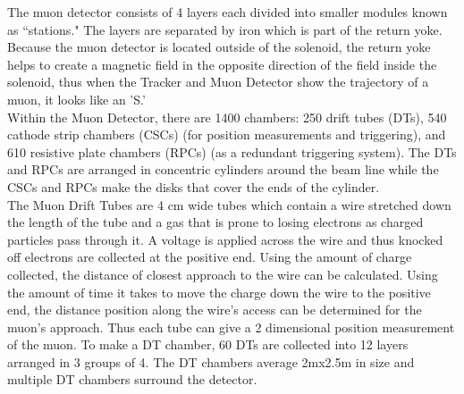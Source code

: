 	The muon detector consists of 4 layers each divided into smaller modules known as ``stations." The layers are separated by iron which is part of the return yoke. Because the muon detector is located outside of the solenoid, the return yoke helps to create a magnetic field in the opposite direction of the field inside the solenoid, thus when the Tracker and Muon Detector show the trajectory of a muon, it looks like an 'S.'\\
	
	Within the Muon Detector, there are 1400 chambers: 250 drift tubes (DTs), 540 cathode strip chambers (CSCs) (for position measurements and triggering), and 610 resistive plate chambers (RPCs) (as a redundant triggering system). The DTs and RPCs are arranged in concentric cylinders around the beam line while the CSCs and RPCs make the disks that cover the ends of the cylinder.\\
	
	The Muon Drift Tubes are 4 cm wide tubes which contain a wire stretched down the length of the tube and a gas that is prone to losing electrons as charged particles pass through it. A voltage is applied across the wire and thus knocked off electrons are collected at the positive end. Using the amount of charge collected, the distance of closest approach to the wire can be calculated. Using the amount of time it takes to move the charge down the wire to the positive end, the distance position along the wire's access can be determined for the muon's approach. Thus each tube can give a 2 dimensional position measurement of the muon. To make a DT chamber, 60 DTs are collected into 12 layers arranged in 3 groups of 4. The DT chambers average 2mx2.5m in size and multiple DT chambers surround the detector.\\
	
